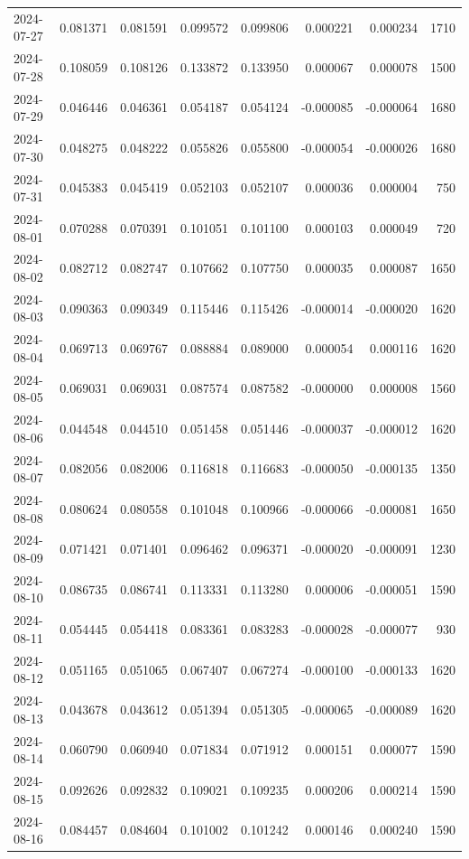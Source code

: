 \begin{tabular}{lrrrrrrr}
2024-07-27 & 0.081371 & 0.081591 & 0.099572 & 0.099806 & 0.000221 & 0.000234 & 1710 \\
2024-07-28 & 0.108059 & 0.108126 & 0.133872 & 0.133950 & 0.000067 & 0.000078 & 1500 \\
2024-07-29 & 0.046446 & 0.046361 & 0.054187 & 0.054124 & -0.000085 & -0.000064 & 1680 \\
2024-07-30 & 0.048275 & 0.048222 & 0.055826 & 0.055800 & -0.000054 & -0.000026 & 1680 \\
2024-07-31 & 0.045383 & 0.045419 & 0.052103 & 0.052107 & 0.000036 & 0.000004 & 750 \\
2024-08-01 & 0.070288 & 0.070391 & 0.101051 & 0.101100 & 0.000103 & 0.000049 & 720 \\
2024-08-02 & 0.082712 & 0.082747 & 0.107662 & 0.107750 & 0.000035 & 0.000087 & 1650 \\
2024-08-03 & 0.090363 & 0.090349 & 0.115446 & 0.115426 & -0.000014 & -0.000020 & 1620 \\
2024-08-04 & 0.069713 & 0.069767 & 0.088884 & 0.089000 & 0.000054 & 0.000116 & 1620 \\
2024-08-05 & 0.069031 & 0.069031 & 0.087574 & 0.087582 & -0.000000 & 0.000008 & 1560 \\
2024-08-06 & 0.044548 & 0.044510 & 0.051458 & 0.051446 & -0.000037 & -0.000012 & 1620 \\
2024-08-07 & 0.082056 & 0.082006 & 0.116818 & 0.116683 & -0.000050 & -0.000135 & 1350 \\
2024-08-08 & 0.080624 & 0.080558 & 0.101048 & 0.100966 & -0.000066 & -0.000081 & 1650 \\
2024-08-09 & 0.071421 & 0.071401 & 0.096462 & 0.096371 & -0.000020 & -0.000091 & 1230 \\
2024-08-10 & 0.086735 & 0.086741 & 0.113331 & 0.113280 & 0.000006 & -0.000051 & 1590 \\
2024-08-11 & 0.054445 & 0.054418 & 0.083361 & 0.083283 & -0.000028 & -0.000077 & 930 \\
2024-08-12 & 0.051165 & 0.051065 & 0.067407 & 0.067274 & -0.000100 & -0.000133 & 1620 \\
2024-08-13 & 0.043678 & 0.043612 & 0.051394 & 0.051305 & -0.000065 & -0.000089 & 1620 \\
2024-08-14 & 0.060790 & 0.060940 & 0.071834 & 0.071912 & 0.000151 & 0.000077 & 1590 \\
2024-08-15 & 0.092626 & 0.092832 & 0.109021 & 0.109235 & 0.000206 & 0.000214 & 1590 \\
2024-08-16 & 0.084457 & 0.084604 & 0.101002 & 0.101242 & 0.000146 & 0.000240 & 1590 \\

\end{tabular}
